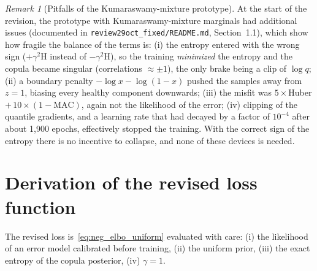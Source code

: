 \documentclass[11pt,a4paper]{article}
\numberwithin{equation}{section}
\theoremstyle{plain}
\theoremstyle{definition}
\theoremstyle{remark}
\newtheorem{remark}[proposition]{Remark}
\newcommand{\Hent}{\mathrm{H}}
\newcommand{\MAC}{\mathrm{MAC}}
\begin{document}
\begin{remark}[Pitfalls of the Kumaraswamy-mixture prototype]
At the start of the revision, the prototype with Kumaraswamy-mixture marginals had additional issues (documented in \texttt{review29oct\_fixed/README.md}, Section~1.1), which show how fragile the balance of the terms is:
(i) the entropy entered with the wrong sign ($+\gamma^2\Hent$ instead of $-\gamma^2\Hent$), so the training \emph{minimized} the entropy and the copula became singular (correlations $\approx\pm1$), the only brake being a clip of $\log q$;
(ii) a boundary penalty $-\log x-\log(1-x)$ pushed the samples away from $z=1$, biasing every healthy component downwards;
(iii) the misfit was $5\times$Huber$+\,10\times(1-\MAC)$, again not the likelihood of the error;
(iv) clipping of the quantile gradients, and a learning rate that had decayed by a factor of $10^{-4}$ after about 1,900 epochs, effectively stopped the training.
With the correct sign of the entropy there is no incentive to collapse, and none of these devices is needed.
\end{remark}

\section{Derivation of the revised loss function}
\label{sec:revised}
The revised loss is~\eqref{eq:neg_elbo_uniform} evaluated with care: (i) the likelihood of an error model calibrated before training, (ii) the uniform prior, (iii) the exact entropy of the copula posterior, (iv) $\gamma=1$.
\end{document}
